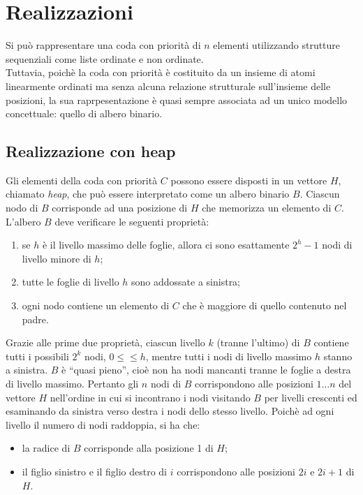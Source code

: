 \documentclass[12pt]{report}
\begin{document}
  	\section{Realizzazioni}
  	Si può rappresentare una coda con priorità di $n$ elementi utilizzando strutture sequenziali come liste ordinate e non ordinate. \\
  	Tuttavia, poichè la coda con priorità è costituito da un insieme di atomi linearmente ordinati ma senza alcuna relazione strutturale sull'insieme delle posizioni, la sua raprpesentazione è quasi sempre associata ad un unico modello concettuale: quello di albero binario.
  	\subsection{Realizzazione con heap}
  	Gli elementi della coda con priorità $C$ possono essere disposti in un vettore $H$, chiamato \textit{heap}, che può essere interpretato come un albero binario $B$. Ciascun nodo di $B$ corrisponde ad una posizione di $H$ che memorizza un elemento di $C$. L'albero $B$ deve verificare le seguenti proprietà:
  		\begin{enumerate}
  			\item se $h$ è il livello massimo delle foglie, allora ci sono esattamente $2^h - 1$ nodi di livello minore di $h$;
  			\item tutte le foglie di livello $h$ sono addossate a sinistra;
  			\item ogni nodo contiene un elemento di $C$ che è maggiore di quello contenuto nel padre.
  		\end{enumerate}
  	Grazie alle prime due proprietà, ciascun livello $k$ (tranne l'ultimo) di $B$ contiene tutti i possibili $2^k$ nodi, $0 \leq  \leq h$, mentre tutti i nodi di livello massimo $h$ stanno a sinistra. $B$ è ``quasi pieno'', cioè non ha nodi mancanti tranne le foglie a destra di livello massimo. Pertanto gli $n$ nodi di $B$ corrispondono alle posizioni $1\dots n$ del vettore $H$ nell'ordine in cui si incontrano i nodi visitando $B$ per livelli crescenti ed esaminando da sinistra verso destra i nodi dello stesso livello. Poichè ad ogni livello il numero di nodi raddoppia, si ha che:
  	\begin{itemize}
  		\item la radice di $B$ corrisponde alla posizione 1 di $H$;
  		\item il figlio sinistro e il figlio destro di $i$ corrispondono alle posizioni $2i$ e $2i+1$ di $H$.
  	\end{itemize}
\end{document}

